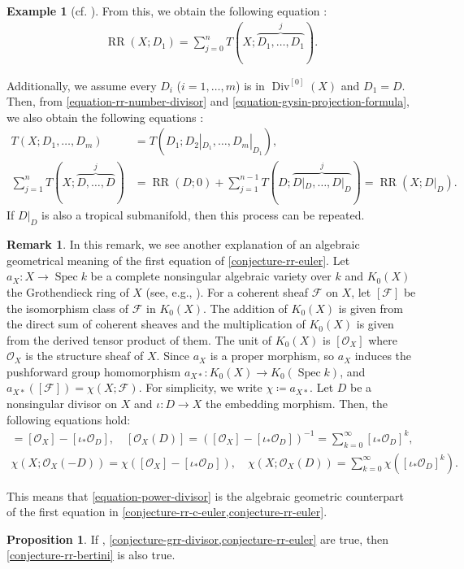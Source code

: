 \documentclass[a4paper,dvipdfmx,reqno,12pt]{amsart}
\theoremstyle{definition}
\newtheorem{example}[theorem]{Example}
\newtheorem{proposition}[theorem]{Proposition}
\newtheorem{remark}[theorem]{Remark}
\newcommand{\deq}{\coloneqq}
\newcommand{\opn}[1]{\operatorname{#1}}
\numberwithin{equation}{section}
\begin{document}
\begin{example}[{cf. \cite[Chapter 13 Appendix]{MR2810322}}]
From this, we obtain the following equation
\cite[.(14)]{MR1335917}:
\begin{align}
\opn{RR}(X;D_1)=\sum_{j=0}^{n}T(X;\overbrace{D_1,\ldots,D_1}^{j}).
\end{align}

Additionally, we assume every $D_i$ ($i=1,\ldots,m$) is
in $\opn{Div}^{[0]}(X)$ and $D_1=D$.
Then, from 
\cref{equation-rr-number-divisor} and
\cref{equation-gysin-projection-formula},
we also obtain the following equations \cite[Theorem 11.2.1]{MR1335917}:
\begin{align}
T(X;D_1,\ldots,D_m)&=T(D_1;D_2|_{D_1},\ldots,D_m|_{D_1}), \\
\sum_{j=1}^{n}T(X;\overbrace{D,\ldots,D}^{j})
&=\opn{RR}(D;0)+\sum_{j=1}^{n-1}T(D;\overbrace{D|_D,\ldots,D|_{D}}^{j})
=\opn{RR}(X;D|_D).
\label{equation-rr-reduction}
\end{align}
If $D|_D$ is also a tropical submanifold,
then this process can be repeated.
\end{example}

\begin{remark}
\label{remark-grothendieck-group}
In this remark, we see another explanation
of an algebraic geometrical meaning of the first
equation of \cref{conjecture-rr-euler}.
Let $a_X\colon X\to \opn{Spec}k$
be a complete nonsingular algebraic variety over $k$
and $K_0(X)$ the Grothendieck ring of $X$
(see, e.g., \cite[]{MR1644323}).
For a coherent sheaf $\mathcal{F}$ on $X$, 
let $[\mathcal{F}]$ be the isomorphism class of
$\mathcal{F}$ in $K_0(X)$.
The addition of $K_0(X)$ is given from
the direct sum of coherent sheaves and
the multiplication of $K_0(X)$ is given
from the derived tensor product of them.   
The unit of $K_0(X)$ is $[\mathcal{O}_X]$
where $\mathcal{O}_X$ is the structure sheaf of $X$.
Since $a_X$ is a proper morphism, so $a_X$
induces the pushforward group homomorphism
$a_{X*}\colon K_0(X)\to K_0(\opn{Spec}k)$,
and $a_{X*}([\mathcal{F}])=
\chi(X;\mathcal{F})$.
For simplicity, we write $\chi\deq a_{X*}$.
Let $D$ be a nonsingular divisor on $X$ and 
$\iota\colon D\to X$ the embedding morphism.
Then, the following equations hold:
\begin{align}
[\mathcal{O}_X(-D)]=
[\mathcal{O}_X]-[\iota_*\mathcal{O}_{D}], \quad
[\mathcal{O}_X(D)]=
([\mathcal{O}_X]-[\iota_*\mathcal{O}_{D}])^{-1}
=\sum_{k=0}^{\infty}[\iota_*\mathcal{O}_D]^{k}, \\
\chi(X;\mathcal{O}_X(-D))=
\chi([\mathcal{O}_X]-[\iota_*\mathcal{O}_{D}]), \quad
\chi(X;\mathcal{O}_X(D))=
\sum_{k=0}^{\infty}\chi([\iota_*\mathcal{O}_D]^{k}).
\label{equation-power-divisor}
\end{align}
\end{remark}
This means that \eqref{equation-power-divisor} is 
the algebraic geometric counterpart of
the first equation in
\cref{conjecture-rr-c-euler,conjecture-rr-euler}.
\begin{proposition}
If \label{proposition-euler-to-bertini}
\cite[Conjecture 6.13]{demedrano2023chern},
\cref{conjecture-grr-divisor,conjecture-rr-euler}
are true, then \cref{conjecture-rr-bertini} is also true. 
\end{proposition}
\end{document}
